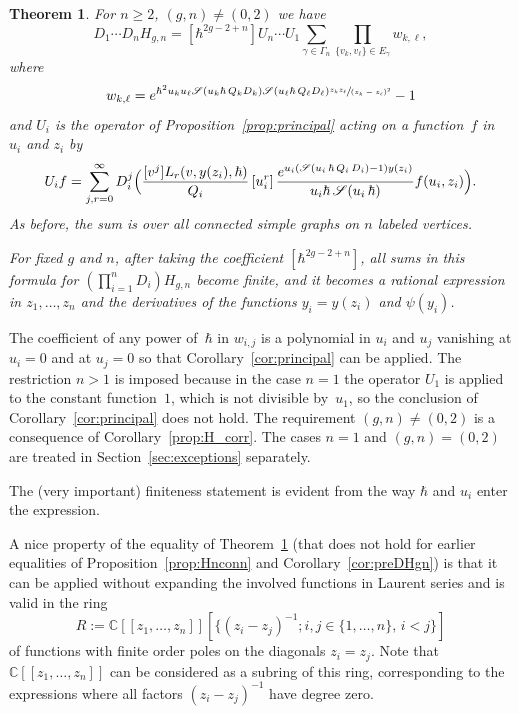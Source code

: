 \documentclass[JEP,XML,SOM,Unicode,NoEqCountersInSection,NoFloatCountersInSection]{cedram}
\let\mathcal\mathscr
\newcommand{\llbracket}{[\![}
\newcommand{\rrbracket}{]\!]}
\theoremstyle{plain}
\newtheorem{theorem}{Theorem}[section]
\theoremstyle{definition}
\theoremstyle{remark}
\newcommand{\cS}{\mathcal{S}}
\newcommand{\Hc}{H}
\begin{document}
\begin{theorem}\label{prop:mainprop} For $n\geq 2$, $(g,n)\neq(0,2)$ we have
\begin{equation}\label{eq:mainprop}
D_1\cdots D_nH_{g,n}=[\hbar^{2g-2+n}]
U_n\cdots U_1
\sum_{\gamma \in \Gamma_n}\prod_{\{v_k,v_\ell\}\in E_\gamma} w_{k,\ell},
\end{equation}
where
\begin{equation}\label{eq:wkl}
w_{k,\ell}=e^{\hbar^2u_ku_\ell\cS(u_k\hbar\,Q_k D_k)\cS(u_\ell\hbar\,Q_\ell D_\ell)
\sfrac{z_k z_\ell}{(z_k-z_\ell)^2}}-1
\end{equation}
and $U_{i}$ is the operator of Proposition~\ref{prop:principal} acting on a function~$f$ in~$u_i$ and $z_i$ by
\begin{equation*}\label{Uioperator}
U_{i} f=\sum_{j,r=0}^\infty D_i^j\Bigl(\frac{[v^j]L_r(v,y(z_i),\hbar)}{Q_i}
\,[u_i^r]\, \frac{e^{u_i(\cS(u_i\,\hbar\,Q_i\,D_i)-1)y(z_i)}}{u_i\hbar\,\cS(u_i\,\hbar)}f(u_i,z_i) \Bigr).
\end{equation*}
As before, the sum is over all connected simple graphs
on $n$ labeled vertices.

For fixed $g$ and $n$, after taking the coefficient $[\hbar^{2g-2+n}]$, all sums in this formula for $\left(\prod_{i=1}^n D_i\right) \Hc_{g,n}$ become finite, and it becomes a rational expression in $z_1,\ldots,z_n$ and the derivatives of the functions $y_i=y(z_i)$ and $\psi(y_i)$.
\end{theorem}

The coefficient of any power of~$\hbar$ in $w_{i,j}$ is a polynomial in $u_i$ and $u_j$ vanishing at $u_i=0$ and at $u_j=0$ so that Corollary~\ref{cor:principal} can be applied.
The restriction $n>1$ is imposed because in the case $n=1$ the operator $U_1$ is applied to the constant function~$1$, which is not divisible by~$u_1$, so the conclusion of Corollary~\ref{cor:principal} does not hold. The requirement $(g,n)\ne(0,2)$ is a consequence of Corollary~\ref{prop:H_corr}. The cases $n=1$ and $(g,n)=(0,2)$ are treated in Section~\ref{sec:exceptions} separately.

The (very important) finiteness statement is evident from the way $\hbar$ and $u_i$ enter the expression.

A nice property of the equality of Theorem~\ref{prop:mainprop} (that does not hold for earlier equalities of Proposition~\ref{prop:Hnconn} and Corollary~\ref{cor:preDHgn})
is that it can be applied without expanding the involved functions in Laurent series and is valid in the ring
\[
R:=\mathbb{C}\llbracket z_1,\dots,z_n\rrbracket [\{(z_i-z_j)^{-1};i,j\in\{1,\ldots,n\},\,i<j\}]
\]
of functions with finite order poles on the diagonals $z_i=z_j$. Note that $\mathbb{C}\llbracket z_1,\dots,z_n\rrbracket $ can be considered as a subring of this ring, corresponding to the expressions where all factors $(z_i-z_j)^{-1}$ have degree zero.
\end{document}
